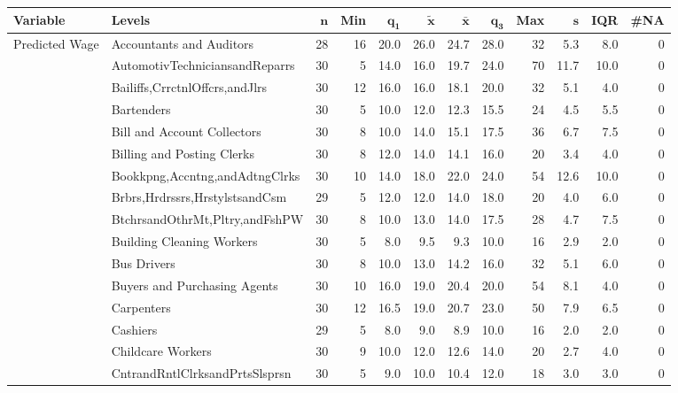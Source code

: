 {\footnotesize
\begin{longtable}{llrrrrrrrrrr}
 \textbf{Variable} & \textbf{Levels} & $\mathbf{n}$ & \textbf{Min} & $\mathbf{q_1}$ & $\mathbf{\widetilde{x}}$ & $\mathbf{\bar{x}}$ & $\mathbf{q_3}$ & \textbf{Max} & $\mathbf{s}$ & \textbf{IQR} & \textbf{\#NA} \\ 
  \hline
Predicted Wage & Accountants and Auditors &   28 & 16 & 20.0 & 26.0 & 24.7 & 28.0 & 32 &  5.3 &  8.0 & 0 \\ 
   & AutomotivTechniciansandReparrs &   30 &  5 & 14.0 & 16.0 & 19.7 & 24.0 & 70 & 11.7 & 10.0 & 0 \\ 
   & Bailiffs,CrrctnlOffcrs,andJlrs &   30 & 12 & 16.0 & 16.0 & 18.1 & 20.0 & 32 &  5.1 &  4.0 & 0 \\ 
   & Bartenders &   30 &  5 & 10.0 & 12.0 & 12.3 & 15.5 & 24 &  4.5 &  5.5 & 0 \\ 
   & Bill and Account Collectors &   30 &  8 & 10.0 & 14.0 & 15.1 & 17.5 & 36 &  6.7 &  7.5 & 0 \\ 
   & Billing and Posting Clerks &   30 &  8 & 12.0 & 14.0 & 14.1 & 16.0 & 20 &  3.4 &  4.0 & 0 \\ 
   & Bookkpng,Accntng,andAdtngClrks &   30 & 10 & 14.0 & 18.0 & 22.0 & 24.0 & 54 & 12.6 & 10.0 & 0 \\ 
   & Brbrs,Hrdrssrs,HrstylstsandCsm &   29 &  5 & 12.0 & 12.0 & 14.0 & 18.0 & 20 &  4.0 &  6.0 & 0 \\ 
   & BtchrsandOthrMt,Pltry,andFshPW &   30 &  8 & 10.0 & 13.0 & 14.0 & 17.5 & 28 &  4.7 &  7.5 & 0 \\ 
   & Building Cleaning Workers &   30 &  5 &  8.0 &  9.5 &  9.3 & 10.0 & 16 &  2.9 &  2.0 & 0 \\ 
   & Bus Drivers &   30 &  8 & 10.0 & 13.0 & 14.2 & 16.0 & 32 &  5.1 &  6.0 & 0 \\ 
   & Buyers and Purchasing Agents &   30 & 10 & 16.0 & 19.0 & 20.4 & 20.0 & 54 &  8.1 &  4.0 & 0 \\ 
   & Carpenters &   30 & 12 & 16.5 & 19.0 & 20.7 & 23.0 & 50 &  7.9 &  6.5 & 0 \\ 
   & Cashiers &   29 &  5 &  8.0 &  9.0 &  8.9 & 10.0 & 16 &  2.0 &  2.0 & 0 \\ 
   & Childcare Workers &   30 &  9 & 10.0 & 12.0 & 12.6 & 14.0 & 20 &  2.7 &  4.0 & 0 \\ 
   & CntrandRntlClrksandPrtsSlsprsn &   30 &  5 &  9.0 & 10.0 & 10.4 & 12.0 & 18 &  3.0 &  3.0 & 0 \\ 

\end{longtable}}
